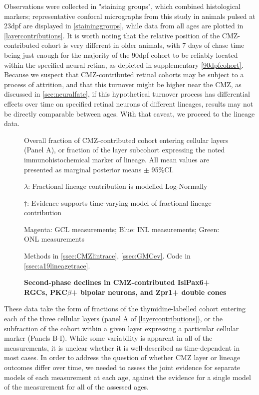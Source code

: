Observations were collected in "staining groups", which combined histological markers; representative confocal micrographs from this study in animals pulsed at 23dpf are displayed in \autoref{staininggroups}, while data from all ages are plotted in \autoref{layercontributions}. It is worth noting that the relative position of the CMZ-contributed cohort is very different in older animals, with 7 days of chase time being just enough for the majority of the 90dpf cohort to be reliably located within the specified neural retina, as depicted in supplementary \autoref{90dpfcohort}. Because we suspect that CMZ-contributed retinal cohorts may be subject to a process of attrition, and that this turnover might be higher near the CMZ, as discussed in \autoref{sec:neuralfate}, if this hypothetical turnover process has differential effects over time on specified retinal neurons of different lineages, results may not be directly comparable between ages. With that caveat, we proceed to the lineage data.

\begin{figure}[!h]
    \caption{{\bf Second-phase declines in CMZ-contributed Isl\/Pax6+ RGCs, PKC$\beta$+ bipolar neurons, and Zpr1+ double cones}}
    Overall fraction of CMZ-contributed cohort entering cellular layers (Panel A), or fraction of the layer subcohort expressing the noted immunohistochemical marker of lineage. All mean values are presented as marginal posterior means $\pm$ 95\%CI.

    $\lambda$: Fractional lineage contribution is modelled Log-Normally

    $\dagger$: Evidence supports time-varying model of fractional lineage contribution

    Magenta: GCL measurements; Blue: INL measurements; Green: ONL measurements

    Methods in \autoref{ssec:CMZlintrace}, \autoref{ssec:GMCev}.
    Code in \autoref{ssec:a19lineagetrace}.    
    \label{layercontributions}
\end{figure}

These data take the form of fractions of the thymidine-labelled cohort entering each of the three cellular layers (panel A of \autoref{layercontributions}), or the subfraction of the cohort within a given layer expressing a particular cellular marker (Panels B-I). While some variability is apparent in all of the measurements, it is unclear whether it is well-described as time-dependent in most cases. In order to address the question of whether CMZ layer or lineage outcomes differ over time, we needed to assess the joint evidence for separate models of each measurement at each age, against the evidence for a single model of the measurement for all of the assessed ages. 

